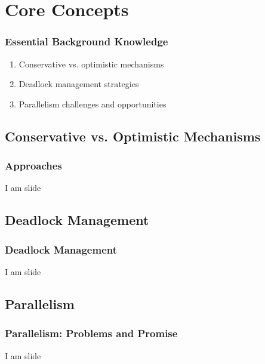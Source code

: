 % 

\section{Core Concepts}
%
\begin{frame}\frametitle{Essential Background Knowledge}
\begin{enumerate}
	\item Conservative vs. optimistic mechanisms
	\item Deadlock management strategies
	\item Parallelism challenges and opportunities
\end{enumerate}
\end{frame}

\subsection{Conservative vs. Optimistic Mechanisms}
\begin{frame}\frametitle{Approaches}
	I am slide
\end{frame}

\subsection{Deadlock Management}
\begin{frame}\frametitle{Deadlock Management}
	I am slide
\end{frame}

\subsection{Parallelism}
\begin{frame}\frametitle{Parallelism: Problems and Promise}
	I am slide
\end{frame}

\endinput  %

